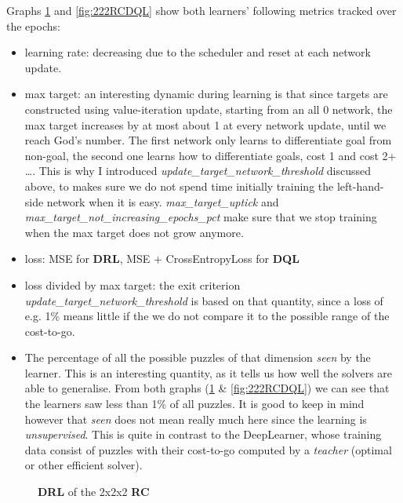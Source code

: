 \noindent Graphs \ref{fig:222RCDRL} and \ref{fig:222RCDQL} show both learners' following metrics tracked over the epochs:
\begin{itemize}
\item learning rate: decreasing due to the scheduler and reset at each network update.
\item max target: an interesting dynamic during learning is that since targets are constructed using value-iteration update, starting from an all 0 network, the max target increases by at most about 1 at every network update, until we reach God's number. The first network only learns to differentiate goal from non-goal, the second one learns how to differentiate goals, cost 1 and cost 2+ \dots. This is why I introduced \textit{update\_target\_network\_threshold} discussed above, to makes sure we do not spend time initially training the left-hand-side network when it is easy. \textit{max\_target\_uptick} and \textit{max\_target\_not\_increasing\_epochs\_pct} make sure that we stop training when the max target does not grow anymore.
\item loss: MSE for \textbf{DRL}, MSE + CrossEntropyLoss for \textbf{DQL}
\item loss divided by max target: the exit criterion \textit{update\_target\_network\_threshold} is based on that quantity, since a loss of e.g. 1\% means little if the we do not compare it to the possible range of the cost-to-go.
\item The percentage of all the possible puzzles of that dimension \textit{seen} by the learner. This is an interesting quantity, as it tells us how well the solvers are able to generalise. From both graphs (\ref{fig:222RCDRL} \& \ref{fig:222RCDQL}) we can see that the learners saw less than 1\% of all puzzles. It is good to keep in mind however that \textit{seen} does not mean really much here since the learning is \textit{unsupervised}. This is quite in contrast to the DeepLearner, whose training data consist of puzzles with their cost-to-go computed by a \textit{teacher} (optimal or other efficient solver).
\end{itemize}


\begin{figure}[H]
  \noindent
  \caption[222RCDRL]{\textbf{DRL} of the 2x2x2 \textbf{RC}}
  \label{fig:222RCDRL}
\end{figure}

